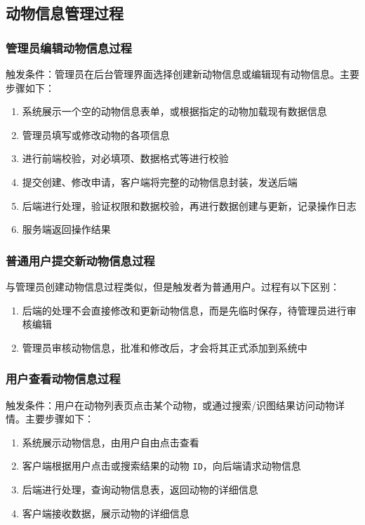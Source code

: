 \documentclass[12pt,a4paper,UTF8]{article}
\begin{document}
\subsection{动物信息管理过程}

\subsubsection{管理员编辑动物信息过程}

触发条件：管理员在后台管理界面选择创建新动物信息或编辑现有动物信息。主要步骤如下：

\begin{enumerate}[topsep=2pt, partopsep=0pt]
  \item 系统展示一个空的动物信息表单，或根据指定的动物加载现有数据信息
  \item 管理员填写或修改动物的各项信息
  \item 进行前端校验，对必填项、数据格式等进行校验
  \item 提交创建、修改申请，客户端将完整的动物信息封装，发送后端
  \item 后端进行处理，验证权限和数据校验，再进行数据创建与更新，记录操作日志
  \item 服务端返回操作结果
\end{enumerate}

\subsubsection{普通用户提交新动物信息过程}

与管理员创建动物信息过程类似，但是触发者为普通用户。过程有以下区别：

\begin{enumerate}[topsep=2pt, partopsep=0pt]
  \item 后端的处理不会直接修改和更新动物信息，而是先临时保存，待管理员进行审核编辑
  \item 管理员审核动物信息，批准和修改后，才会将其正式添加到系统中
\end{enumerate}

\subsubsection{用户查看动物信息过程}

触发条件：用户在动物列表页点击某个动物，或通过搜索/识图结果访问动物详情。主要步骤如下：

\begin{enumerate}[topsep=2pt, partopsep=0pt]
  \item 系统展示动物信息，由用户自由点击查看
  \item 客户端根据用户点击或搜索结果的动物 \verb|ID|，向后端请求动物信息
  \item 后端进行处理，查询动物信息表，返回动物的详细信息
  \item 客户端接收数据，展示动物的详细信息
\end{enumerate}
\end{document}
